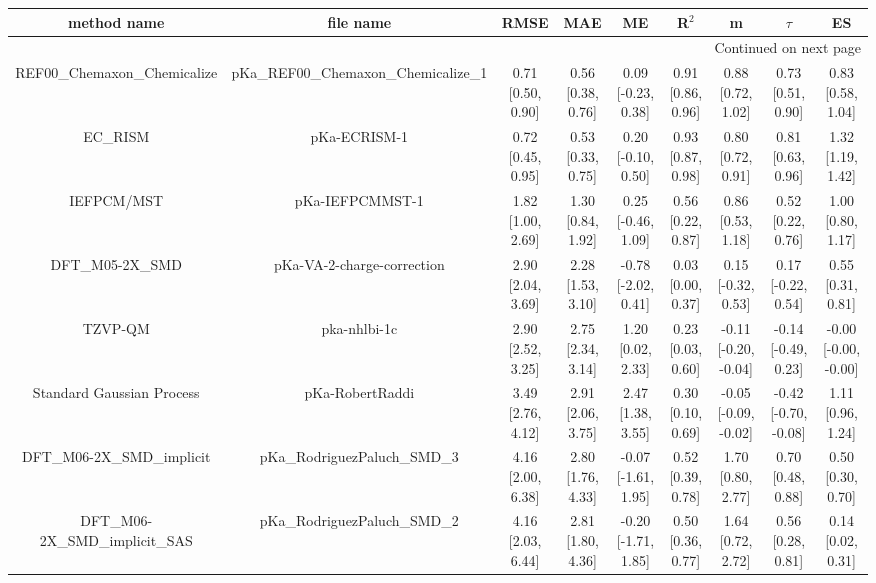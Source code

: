 \documentclass{article}
\begin{document}
\begin{center}
\scriptsize
\begin{longtable}{|ccccccccc|}
\toprule
                   method name &                             file name &               RMSE &                MAE &                   ME &              R$^2$ &                     m &                $\tau$ &                    ES \\
\midrule
\endhead
\midrule
\multicolumn{9}{r}{{Continued on next page}} \\
\midrule
\endfoot

\bottomrule
\endlastfoot
    REF00_Chemaxon_Chemicalize &  pKa\_REF00\_Chemaxon\_Chemicalize\_1 &  0.71 [0.50, 0.90] &  0.56 [0.38, 0.76] &   0.09 [-0.23, 0.38] &  0.91 [0.86, 0.96] &     0.88 [0.72, 1.02] &     0.73 [0.51, 0.90] &     0.83 [0.58, 1.04] \\
                       EC_RISM &                          pKa-ECRISM-1 &  0.72 [0.45, 0.95] &  0.53 [0.33, 0.75] &   0.20 [-0.10, 0.50] &  0.93 [0.87, 0.98] &     0.80 [0.72, 0.91] &     0.81 [0.63, 0.96] &     1.32 [1.19, 1.42] \\
                    IEFPCM/MST &                       pKa-IEFPCMMST-1 &  1.82 [1.00, 2.69] &  1.30 [0.84, 1.92] &   0.25 [-0.46, 1.09] &  0.56 [0.22, 0.87] &     0.86 [0.53, 1.18] &     0.52 [0.22, 0.76] &     1.00 [0.80, 1.17] \\
                DFT_M05-2X_SMD &            pKa-VA-2-charge-correction &  2.90 [2.04, 3.69] &  2.28 [1.53, 3.10] &  -0.78 [-2.02, 0.41] &  0.03 [0.00, 0.37] &    0.15 [-0.32, 0.53] &    0.17 [-0.22, 0.54] &     0.55 [0.31, 0.81] \\
                       TZVP-QM &                          pka-nhlbi-1c &  2.90 [2.52, 3.25] &  2.75 [2.34, 3.14] &    1.20 [0.02, 2.33] &  0.23 [0.03, 0.60] &  -0.11 [-0.20, -0.04] &   -0.14 [-0.49, 0.23] &  -0.00 [-0.00, -0.00] \\
     Standard Gaussian Process &                       pKa-RobertRaddi &  3.49 [2.76, 4.12] &  2.91 [2.06, 3.75] &    2.47 [1.38, 3.55] &  0.30 [0.10, 0.69] &  -0.05 [-0.09, -0.02] &  -0.42 [-0.70, -0.08] &     1.11 [0.96, 1.24] \\
       DFT_M06-2X_SMD_implicit &          pKa\_RodriguezPaluch\_SMD\_3 &  4.16 [2.00, 6.38] &  2.80 [1.76, 4.33] &  -0.07 [-1.61, 1.95] &  0.52 [0.39, 0.78] &     1.70 [0.80, 2.77] &     0.70 [0.48, 0.88] &     0.50 [0.30, 0.70] \\
   DFT_M06-2X_SMD_implicit_SAS &          pKa\_RodriguezPaluch\_SMD\_2 &  4.16 [2.03, 6.44] &  2.81 [1.80, 4.36] &  -0.20 [-1.71, 1.85] &  0.50 [0.36, 0.77] &     1.64 [0.72, 2.72] &     0.56 [0.28, 0.81] &     0.14 [0.02, 0.31] \\

\end{longtable}
\end{center}
\end{document}
